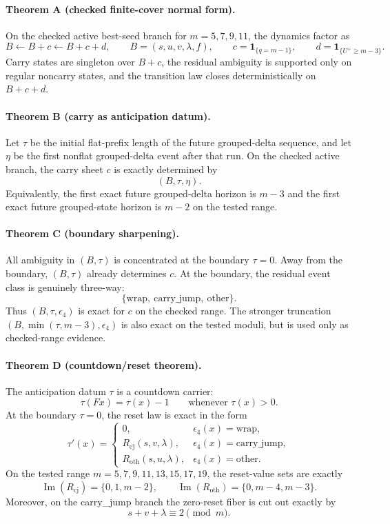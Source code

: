 
\paragraph{Theorem A (checked finite-cover normal form).}
On the checked active best-seed branch for $m=5,7,9,11$, the dynamics factor as
\[
B \leftarrow B+c \leftarrow B+c+d,
\qquad
B=(s,u,v,\lambda,f),
\qquad
c=\mathbf 1_{\{q=m-1\}},
\qquad
d=\mathbf 1_{\{U^+\ge m-3\}}.
\]
Carry states are singleton over $B+c$, the residual ambiguity is supported only
on regular noncarry states, and the transition law closes deterministically on
$B+c+d$.

\paragraph{Theorem B (carry as anticipation datum).}
Let $\tau$ be the initial flat-prefix length of the future grouped-delta sequence,
and let $\eta$ be the first nonflat grouped-delta event after that run. On the
checked active branch, the carry sheet $c$ is exactly determined by
\[
(B,\tau,\eta).
\]
Equivalently, the first exact future grouped-delta horizon is $m-3$ and the first
exact future grouped-state horizon is $m-2$ on the tested range.

\paragraph{Theorem C (boundary sharpening).}
All ambiguity in $(B,\tau)$ is concentrated at the boundary $\tau=0$. Away from the
boundary, $(B,\tau)$ already determines $c$. At the boundary, the residual event
class is genuinely three-way:
\[
\{\mathrm{wrap},\ \mathrm{carry\_jump},\ \mathrm{other}\}.
\]
Thus $(B,\tau,\epsilon_4)$ is exact for $c$ on the checked range. The stronger
truncation $(B,\min(\tau,m-3),\epsilon_4)$ is also exact on the tested moduli, but
is used only as checked-range evidence.

\paragraph{Theorem D (countdown/reset theorem).}
The anticipation datum $\tau$ is a countdown carrier:
\[
\tau(Fx)=\tau(x)-1 \qquad \text{whenever } \tau(x)>0.
\]
At the boundary $\tau=0$, the reset law is exact in the form
\[
\tau'(x)=
\begin{cases}
0, & \epsilon_4(x)=\mathrm{wrap},\\
R_{\mathrm{cj}}(s,v,\lambda), & \epsilon_4(x)=\mathrm{carry\_jump},\\
R_{\mathrm{oth}}(s,u,\lambda), & \epsilon_4(x)=\mathrm{other}.
\end{cases}
\]
On the tested range $m=5,7,9,11,13,15,17,19$, the reset-value sets are exactly
\[
\operatorname{Im}(R_{\mathrm{cj}})=\{0,1,m-2\},
\qquad
\operatorname{Im}(R_{\mathrm{oth}})=\{0,m-4,m-3\}.
\]
Moreover, on the carry\_jump branch the zero-reset fiber is cut out exactly by
\[
s+v+\lambda \equiv 2 \pmod m.
\]

